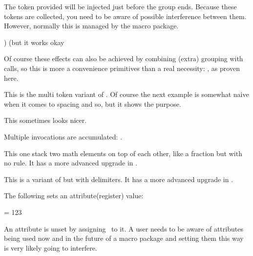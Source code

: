 \stopnewprimitive

\startnewprimitive[title={\prm {atendofgroup}}]

The token provided will be injected just before the group ends. Because
these tokens are collected, you need to be aware of possible interference
between them. However, normally this is managed by the macro package.

\startbuffer
\bgroup
\atendofgroup\unskip
\atendofgroup )%
(but it works okay
\egroup
\stopbuffer

\typebuffer

Of course these effects can also be achieved by combining (extra) grouping with
 calls, so this is more a convenience primitives than a real
necessity: {\inlinebuffer}, as proven here.

\stopnewprimitive

\startnewprimitive[title={\prm {atendofgrouped}}]

This is the multi token variant of . Of course the next
example is somewhat naive when it comes to spacing and so, but it shows the
purpose.

\startbuffer
\bgroup
{}%
%
This sometimes looks nicer.
\egroup
\stopbuffer

\typebuffer

Multiple invocations are accumulated: {\inlinebuffer}.

\stopnewprimitive

\startoldprimitive[title={\prm {atop}}][obsolete=yes]

This one stack two math elements on top of each other, like a fraction but with
no rule. It has a more advanced upgrade in .

\stopoldprimitive

\startoldprimitive[title={\prm {atopwithdelims}}][obsolete=yes]

This is a variant of  but with delimiters. It has a more advanced
upgrade in .

\stopoldprimitive

\startnewprimitive[title={\prm {attribute}}]

The following sets an attribute(register) value:

\starttyping
{} = 123
\stoptyping

An attribute is unset by assigning \the \attributeunsetvalue\ to it. A user needs
to be aware of attributes being used now and in the future of a macro package and
setting them this way is very likely going to interfere.

